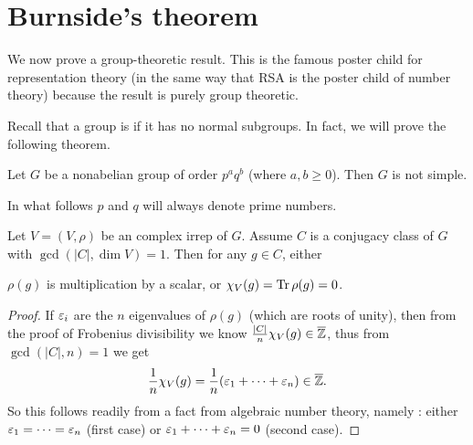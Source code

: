 \section{Burnside's theorem}
We now prove a group-theoretic result.
This is the famous poster child for representation theory
(in the same way that RSA is the poster child of number theory)
because the result is purely group theoretic.

Recall that a group is  if it has no normal subgroups.
In fact, we will prove the following theorem.
\begin{theorem}[Burnside]
	Let $G$ be a nonabelian group of order $p^a q^b$ (where $a,b \ge 0$).
	Then $G$ is not simple.
\end{theorem}
In what follows $p$ and $q$ will always denote prime numbers.

\begin{lemma}[On $\gcd(|C|, \dim V) = 1$]
	\label{lem:burnside_ant_lemma}
	Let $V = (V, \rho)$ be an complex irrep of $G$.
	Assume $C$ is a conjugacy class of $G$ with $\gcd(|C|, \dim V) = 1$.
	Then for any $g \in C$, either
	\begin{itemize}
		\ii $\rho(g)$ is multiplication by a scalar, or
		\ii $\chi_V(g) = \operatorname{Tr} \rho(g) = 0$.
	\end{itemize}
\end{lemma}
\begin{proof}
	If $\varepsilon_i$ are the $n$ eigenvalues of $\rho(g)$ (which are roots of unity),
	then from the proof of Frobenius divisibility we know
	$\frac{|C|}{n} \chi_V(g) \in \overline{\mathbb Z}$,
	thus from $\gcd(|C|, n) = 1$ we get 
	\[ \frac1n \chi_V(g) = \frac1n(\varepsilon_1 + \dots + \varepsilon_n) \in \overline{\mathbb Z}. \]
	So this follows readily from a fact from algebraic number theory,
	namely :
	either $\varepsilon_1 = \dots = \varepsilon_n$ (first case) or
	$\varepsilon_1 + \dots + \varepsilon_n = 0$ (second case).
\end{proof}

